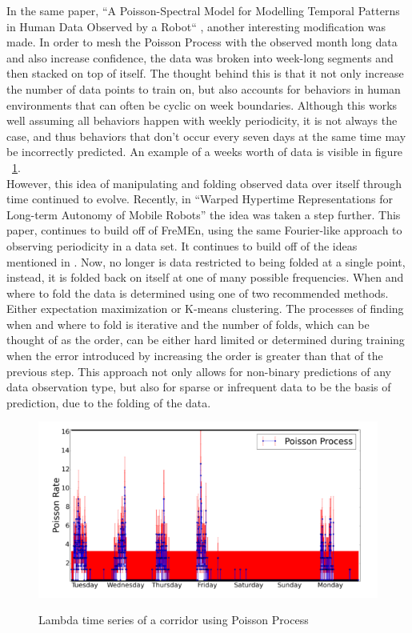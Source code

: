   In the same paper,
  ``A Poisson-Spectral Model for Modelling Temporal Patterns in Human Data Observed by a Robot``
  \cite{Jovan2016}, another interesting modification was made. In order to mesh
  the Poisson Process with the observed month long data and also
  increase confidence, the data was broken into week-long segments and then
  stacked on top of itself. The thought behind this is that it not only
  increase the number of data points to train on, but also accounts for behaviors in human
  environments that can often be cyclic on week boundaries. Although this works well
  assuming all behaviors happen with weekly periodicity, it is not always
  the case, and thus behaviors that don't occur every seven days at the same time
  may be incorrectly predicted. An example of a weeks worth of data is visible
  in figure ~\ref{figure:PSP}. \\

  However, this idea of manipulating and folding observed data over itself through time
  continued to evolve. Recently, in
  ``Warped Hypertime Representations for Long-term Autonomy of Mobile Robots''
  \cite{Krajnik2018} the idea was taken a step further. This paper, continues
  to build off of FreMEn, using the same Fourier-like approach to observing
  periodicity in a data set. It continues to build off of the ideas mentioned
  in \cite{Jovan2016}. Now, no longer is data restricted to being folded at a
  single point, instead, it is folded back on itself at one of many possible
  frequencies. When and where to fold the data is determined using one of two
  recommended methods. Either expectation maximization or K-means clustering.
  The processes of finding when and where to fold is iterative and the number
  of folds, which can be thought of as the order, can be either hard limited
  or determined during training when the error introduced by increasing the
  order is greater than that of the previous step. This approach not only allows
  for non-binary predictions of any data observation type, but also
  for sparse or infrequent data to be the basis of prediction, due to the
  folding of the data. \\



  \begin{figure}[!htb]
    \centering
    \includegraphics[width=\linewidth]{images/poisson-spectral-process.png}
    \caption{Lambda time series of a corridor using Poisson Process}
    \cite{Jovan2016}
    \label{figure:PSP}
  \end{figure}


